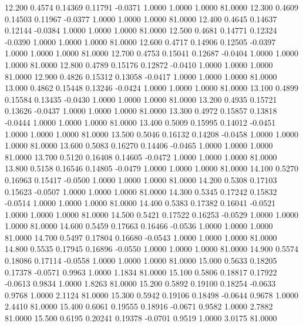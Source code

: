   12.200   0.4574   0.14369   0.11791  -0.0371   1.0000   1.0000   1.0000  81.0000
  12.300   0.4609   0.14503   0.11967  -0.0377   1.0000   1.0000   1.0000  81.0000
  12.400   0.4645   0.14637   0.12144  -0.0384   1.0000   1.0000   1.0000  81.0000
  12.500   0.4681   0.14771   0.12324  -0.0390   1.0000   1.0000   1.0000  81.0000
  12.600   0.4717   0.14906   0.12505  -0.0397   1.0000   1.0000   1.0000  81.0000
  12.700   0.4753   0.15041   0.12687  -0.0404   1.0000   1.0000   1.0000  81.0000
  12.800   0.4789   0.15176   0.12872  -0.0410   1.0000   1.0000   1.0000  81.0000
  12.900   0.4826   0.15312   0.13058  -0.0417   1.0000   1.0000   1.0000  81.0000
  13.000   0.4862   0.15448   0.13246  -0.0424   1.0000   1.0000   1.0000  81.0000
  13.100   0.4899   0.15584   0.13435  -0.0430   1.0000   1.0000   1.0000  81.0000
  13.200   0.4935   0.15721   0.13626  -0.0437   1.0000   1.0000   1.0000  81.0000
  13.300   0.4972   0.15857   0.13818  -0.0444   1.0000   1.0000   1.0000  81.0000
  13.400   0.5009   0.15995   0.14012  -0.0451   1.0000   1.0000   1.0000  81.0000
  13.500   0.5046   0.16132   0.14208  -0.0458   1.0000   1.0000   1.0000  81.0000
  13.600   0.5083   0.16270   0.14406  -0.0465   1.0000   1.0000   1.0000  81.0000
  13.700   0.5120   0.16408   0.14605  -0.0472   1.0000   1.0000   1.0000  81.0000
  13.800   0.5158   0.16546   0.14805  -0.0479   1.0000   1.0000   1.0000  81.0000
  14.100   0.5270   0.16963   0.15417  -0.0500   1.0000   1.0000   1.0000  81.0000
  14.200   0.5308   0.17103   0.15623  -0.0507   1.0000   1.0000   1.0000  81.0000
  14.300   0.5345   0.17242   0.15832  -0.0514   1.0000   1.0000   1.0000  81.0000
  14.400   0.5383   0.17382   0.16041  -0.0521   1.0000   1.0000   1.0000  81.0000
  14.500   0.5421   0.17522   0.16253  -0.0529   1.0000   1.0000   1.0000  81.0000
  14.600   0.5459   0.17663   0.16466  -0.0536   1.0000   1.0000   1.0000  81.0000
  14.700   0.5497   0.17804   0.16680  -0.0543   1.0000   1.0000   1.0000  81.0000
  14.800   0.5535   0.17945   0.16896  -0.0550   1.0000   1.0000   1.0000  81.0000
  14.900   0.5574   0.18086   0.17114  -0.0558   1.0000   1.0000   1.0000  81.0000
  15.000   0.5633   0.18205   0.17378  -0.0571   0.9963   1.0000   1.1834  81.0000
  15.100   0.5806   0.18817   0.17922  -0.0613   0.9834   1.0000   1.8263  81.0000
  15.200   0.5892   0.19100   0.18254  -0.0633   0.9768   1.0000   2.1124  81.0000
  15.300   0.5942   0.19106   0.18498  -0.0644   0.9678   1.0000   2.4410  81.0000
  15.400   0.6061   0.19555   0.18916  -0.0671   0.9582   1.0000   2.7882  81.0000
  15.500   0.6195   0.20241   0.19378  -0.0701   0.9519   1.0000   3.0175  81.0000
